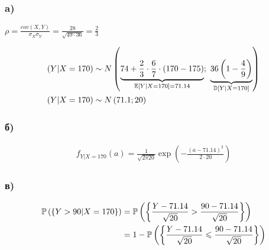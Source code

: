 \documentclass{article}
\begin{document}
\subsubsection*{a)}
$\rho=\displaystyle\frac{cov(X,Y)}{\sigma_X\sigma_Y}=\frac{28}{\sqrt{49\cdot36}}=\frac{2}{3}$

\begin{equation*}
    \begin{aligned}
        (Y|X=170)&\sim N\left(\underbrace{74+\frac{2}{3}\cdot\frac{6}{7}\cdot(170-175)}_{\mathbb{E}\left[Y|X=170\right]=71.14};\ \underbrace{36\left(1-\frac{4}{9}\right)}_{\mathbb{D}\left[Y|X=170\right]}\right)\\
        (Y|X=170)&\sim N\left(71.1;20\right)
    \end{aligned}
\end{equation*}

\subsubsection*{б)}
\begin{equation*}
    \begin{aligned}
        f_{Y|X=170}(a)=\frac{1}{\sqrt{2\pi20}}\exp\left(-\frac{(a-71.14)^2}{2\cdot20}\right)
    \end{aligned}
\end{equation*}


\subsubsection*{в)}

\begin{equation*}
    \begin{aligned}
        \mathbb{P}\left(\{Y>90|X=170\}\right)&=\mathbb{P}\left(\left\{\frac{Y-71.14}{\sqrt{20}}>\frac{90-71.14}{\sqrt{20}}\right\}\right)\\
        &=1-\mathbb{P}\left(\left\{\frac{Y-71.14}{\sqrt{20}}\leqslant\frac{90-71.14}{\sqrt{20}}\right\}\right)
    \end{aligned}
\end{equation*}



\end{document}
